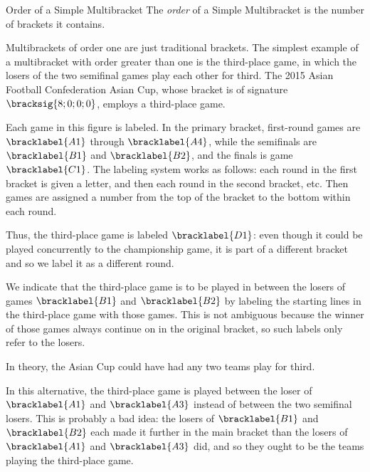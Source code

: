 {    \begin{definition}{Order of a Simple Multibracket}{}
        The \textit{order} of a Simple Multibracket is the number of brackets it contains.
    \end{definition}

    Multibrackets of order one are just traditional brackets. The simplest example of a multibracket with order greater than one is the third-place game, in which the losers of the two semifinal games play each other for third. The 2015 Asian Football Confederation Asian Cup, whose bracket is of signature $\bracksig{8; 0; 0; 0}$, employs a third-place game.


    Each game in this figure is labeled. In the primary bracket, first-round games are $\bracklabel{A1}$ through $\bracklabel{A4}$, while the semifinals are $\bracklabel{B1}$ and $\bracklabel{B2}$, and the finals is game $\bracklabel{C1}$. The labeling system works as follows: each round in the first bracket is given a letter, and then each round in the second bracket, etc. Then games are assigned a number from the top of the bracket to the bottom within each round.
    
    Thus, the third-place game is labeled $\bracklabel{D1}$: even though it could be played concurrently to the championship game, it is part of a different bracket and so we label it as a different round.

    We indicate that the third-place game is to be played in between the losers of games $\bracklabel{B1}$ and $\bracklabel{B2}$ by labeling the starting lines in the third-place game with those games. This is not ambiguous because the winner of those games always continue on in the original bracket, so such labels only refer to the losers. 
    
    In theory, the Asian Cup could have had any two teams play for third.


    In this alternative, the third-place game is played between the loser of $\bracklabel{A1}$ and $\bracklabel{A3}$ instead of between the two semifinal losers. This is probably a bad idea: the losers of $\bracklabel{B1}$ and $\bracklabel{B2}$ each made it further in the main bracket than the losers of $\bracklabel{A1}$ and $\bracklabel{A3}$ did, and so they ought to be the teams playing the third-place game.

}
